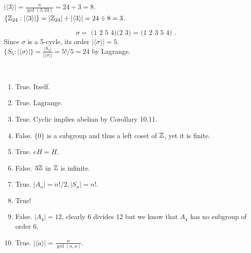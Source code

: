 \documentclass[12pt]{article}
\begin{document}
\begin{problem}[10.12]
$ |\langle 3 \rangle| = \frac{n}{ \gcd ( 3,24) }=24 \div 3 = 8$.\\
$\{ \mathbb{Z}_{24}: |\langle 3 \rangle|\} = | \mathbb{Z}_{24}| \div |\langle 3 \rangle| = 24 \div 8 = 3$.
\end{problem}

\begin{problem}[10.15]
\[
	\sigma = \text{ (1 2 5 4)(2 3) = (1 2 3 5 4) }
.\] 
	Since $ \sigma$ is a 5-cycle, its order $ |\langle \sigma \rangle| = 5$. \\
$ \{S_5 : |\langle \sigma \rangle|\} =\frac{|S_5|}{|\langle \sigma \rangle| } = 5!/5 = 24$ by Lagrange.
\end{problem}

\begin{problem}[10.19]
~\begin{enumerate}[label=\alph*)]
	\item True. Itself.
	\item True. Lagrange.
	\item True. Cyclic implies abelian by Corollary 10.11.
	\item False. $ \{0\} $ is a subgroup and thus a left coset of $ \mathbb{Z}$, yet it is finite.
	\item True. $ eH = H$.
	\item False. $ 3 \mathbb{Z}$ in $ \mathbb{Z}$ is infinite.
	\item True. $ |A_n|=n!/2, |S_n| = n!$.
	\item True!
	\item False. $ |A_4|=12$, clearly $ 6$ divides 12 but we know that  $ A_4$ has no subgroup of order 6.
	\item True. $ |\langle a \rangle| = \frac{n}{ \gcd ( n,a) }$.
\end{enumerate}
\end{problem}
\end{document}
